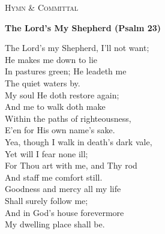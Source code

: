 \label{toc:committal}


\begin{center}
  {\Large\scshape\color{primary} Hymn \& Committal}
  \thinseparator
\end{center}

\vspace{2mm}

\begin{center}
  \textbf{\color{primary} The Lord's My Shepherd (Psalm 23)}
\end{center}

\begin{center}\small
  The Lord’s my Shepherd, I’ll not want;\\
  He makes me down to lie\\
  In pastures green; He leadeth me\\
  The quiet waters by.\\[6pt]

  My soul He doth restore again;\\
  And me to walk doth make\\
  Within the paths of righteousness,\\
  E'en for His own name's sake.\\[6pt]

  Yea, though I walk in death’s dark vale,\\
  Yet will I fear none ill;\\
  For Thou art with me, and Thy rod\\
  And staff me comfort still.\\[6pt]

  Goodness and mercy all my life\\
  Shall surely follow me;\\
  And in God’s house forevermore\\
  My dwelling place shall be.
\end{center}

\thinseparator


\vfill